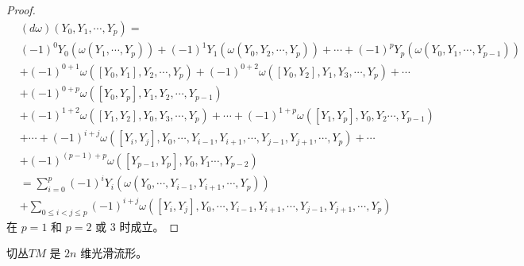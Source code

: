 \begin{proof}
\begin{align*}
&(d \omega)\left(Y_0, Y_1, \cdots,\right.\left.Y_p\right)=\\
&(-1)^0 Y_0\left(\omega\left(Y_1, \cdots, Y_p\right)\right)+(-1)^1 Y_1\left(\omega\left(Y_0, Y_2, \cdots, Y_p\right)\right)+\cdots+(-1)^p Y_p\left(\omega\left(Y_0, Y_1, \cdots, Y_{p-1}\right)\right) \\
&+(-1)^{0+1} \omega\left(\left[Y_0, Y_1\right], Y_2, \cdots, Y_p\right)+(-1)^{0+2} \omega\left(\left[Y_0, Y_2\right], Y_1, Y_3, \cdots, Y_p\right)+\cdots\\
&+(-1)^{0+p} \omega\left(\left[Y_0, Y_p\right], Y_1, Y_2, \cdots, Y_{p-1}\right) \\
&+(-1)^{1+2} \omega\left(\left[Y_1, Y_2\right], Y_0, Y_3, \cdots, Y_p\right)+\cdots+(-1)^{1+p} \omega\left(\left[Y_1, Y_p\right], Y_0, Y_2 \cdots, Y_{p-1}\right) \\
&+\cdots+(-1)^{i+j} \omega\left(\left[Y_i, Y_j\right], Y_0, \cdots, Y_{i-1}, Y_{i+1}, \cdots, Y_{j-1}, Y_{j+1}, \cdots, Y_p\right)+\cdots\\
&+(-1)^{(p-1)+p} \omega\left(\left[Y_{p-1}, Y_p\right], Y_0, Y_1 \cdots, Y_{p-2}\right) \\
&=\sum_{i=0}^p(-1)^i Y_i\left(\omega\left(Y_0, \cdots, Y_{i-1}, Y_{i+1}, \cdots, Y_p\right)\right)\\
&+\sum_{0 \leq i<j \leq p}(-1)^{i+j} \omega\left(\left[Y_i, Y_j\right], Y_0, \cdots, Y_{i-1}, Y_{i+1}, \cdots, Y_{j-1}, Y_{j+1}, \cdots, Y_p\right)
\end{align*}
在 $p=1$ 和 $p=2$ 或 3 时成立。
\end{proof}
\begin{theorem}
切丛$T M$ 是 $2 n$ 维光滑流形。
\end{theorem}
